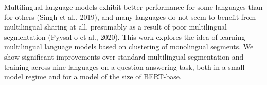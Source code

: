 Multilingual language models exhibit better performance for some languages than for others (Singh et al., 2019), and many languages do not seem to benefit from multilingual sharing at all, presumably as a result of poor multilingual segmentation (Pyysal o et al., 2020). This work explores the idea of learning multilingual language models based on clustering of monolingual segments. We show significant improvements over standard multilingual segmentation and training across nine languages on a question answering task, both in a small model regime and for a model of the size of BERT-base.
